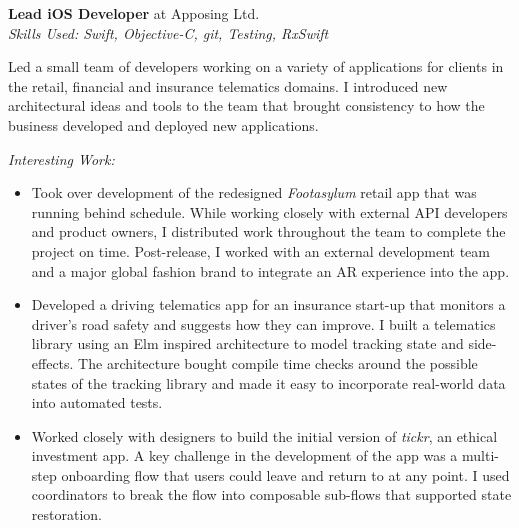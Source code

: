\textbf{Lead iOS Developer} at Apposing Ltd. \\
\textit{Skills Used: Swift, Objective-C, git, Testing, RxSwift}

Led a small team of developers working on a variety of applications for clients
in the retail, financial and insurance telematics domains. I introduced new
architectural ideas and tools to the team that brought consistency to how the
business developed and deployed new applications.

\medskip

\textit{Interesting Work:}

\smallskip

\begin{itemize}

\item Took over development of the redesigned \emph{Footasylum} retail app that
  was running behind schedule. While working closely with external API
  developers and product owners, I distributed work throughout the team to
  complete the project on time. Post-release, I worked with an external
  development team and a major global fashion brand to integrate an AR
  experience into the app.

\item Developed a driving telematics app for an insurance start-up that monitors
  a driver's road safety and suggests how they can improve. I built a telematics
  library using an Elm inspired architecture to model tracking state and
  side-effects. The architecture bought compile time checks around the possible
  states of the tracking library and made it easy to incorporate real-world data
  into automated tests.

\item Worked closely with designers to build the initial version of
  \emph{tickr}, an ethical investment app. A key challenge in the development of
  the app was a multi-step onboarding flow that users could leave and return to
  at any point. I used coordinators to break the flow into composable sub-flows
  that supported state restoration.

\end{itemize}

